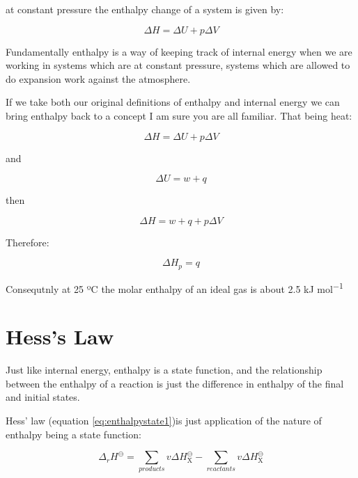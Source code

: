 \documentclass[
]{book}
\begin{document}
at constant pressure the enthalpy change of a system is given by:

\begin{equation}
\Delta H = \Delta U + p\Delta V
\label{eq:enthalpychange}
\end{equation}

Fundamentally enthalpy is a way of keeping track of internal energy when we are working in systems which are at constant pressure, systems which are allowed to do expansion work against the atmosphere.

If we take both our original definitions of enthalpy and internal energy we can bring enthalpy back to a concept I am sure you are all familiar. That being heat:

\begin{equation*}
\Delta H = \Delta U + p\Delta V
\end{equation*}

and

\begin{equation*}
\Delta U = w + q
\end{equation*}

then

\begin{equation*}
\Delta H = w + q + p \Delta V
\end{equation*}

Therefore:

\begin{equation}
\Delta H_p = q
\label{eq:enthalpyconstp}
\end{equation}

Consequtnly at 25 ºC the molar enthalpy of an ideal gas is about 2.5 kJ mol\textsuperscript{−1}

\hypertarget{hesss-law}{%
\section{Hess's Law}\label{hesss-law}}

Just like internal energy, enthalpy is a state function, and the relationship between the enthalpy of a reaction is just the difference in enthalpy of the final and initial states.

Hess' law (equation \eqref{eq:enthalpystate1})is just application of the nature of enthalpy being a state function:

\begin{equation}
\Delta_r H^{\ominus} = \sum_{products}v \Delta H^{\ominus}_\textrm{X}-\sum_{reactants}v \Delta H^{\ominus}_\textrm{X}
\label{eq:enthalpystate1}
\end{equation}
\end{document}
